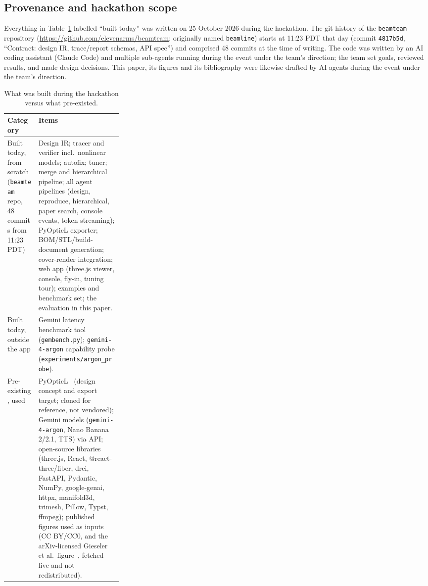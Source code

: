 \documentclass[10pt,twocolumn,letterpaper]{article}
\newcommand{\code}[1]{\texttt{\small #1}}
\begin{document}
\subsection{Provenance and hackathon scope}
\label{sec:provenance}
Everything in Table~\ref{tab:provenance} labelled ``built today'' was written on 25 October 2026 during the hackathon. The git history of the \code{beamteam} repository (\url{https://github.com/elevenarms/beamteam}; originally named \code{beamline}) starts at 11:23 PDT that day (commit \code{4817b5d}, ``Contract: design IR, trace/report schemas, API spec'') and comprised 48 commits at the time of writing. The code was written by an AI coding assistant (Claude Code) and multiple sub-agents running during the event under the team's direction; the team set goals, reviewed results, and made design decisions. This paper, its figures and its bibliography were likewise drafted by AI agents during the event under the team's direction.

\begin{table}[t]
\centering\small
\caption{What was built during the hackathon versus what pre-existed.}
\label{tab:provenance}
\footnotesize
\begin{tabularx}{\linewidth}{@{}>{\raggedright\arraybackslash}p{0.27\linewidth}X@{}}
\toprule
Category & Items \\
\midrule
Built today, from scratch (\code{beamteam} repo, 48 commits from 11:23 PDT) &
Design IR; tracer and verifier incl.\ nonlinear models; autofix; tuner; merge and hierarchical pipeline; all agent pipelines (design, reproduce, hierarchical, paper search, console events, token streaming); PyOpticL exporter; BOM/STL/build-document generation; cover-render integration; web app (three.js viewer, console, fly-in, tuning tour); examples and benchmark set; the evaluation in this paper. \\
\addlinespace
Built today, outside the app &
Gemini latency benchmark tool (\code{gembench.py}); \code{gemini-4-argon} capability probe (\code{experiments/argon\_probe}). \\
\addlinespace
Pre-existing, used &
PyOpticL~\cite{pyopticl} (design concept and export target; cloned for reference, not vendored); Gemini models (\code{gemini-4-argon}, Nano Banana 2/2.1, TTS) via API; open-source libraries (three.js, React, @react-three/fiber, drei, FastAPI, Pydantic, NumPy, google-genai, httpx, manifold3d, trimesh, Pillow, Typst, ffmpeg); published figures used as inputs (CC BY/CC0, and the arXiv-licensed Gieseler et al.\ figure~\cite{gieseler2021}, fetched live and not redistributed). \\
\bottomrule
\end{tabularx}
\end{table}
\end{document}
